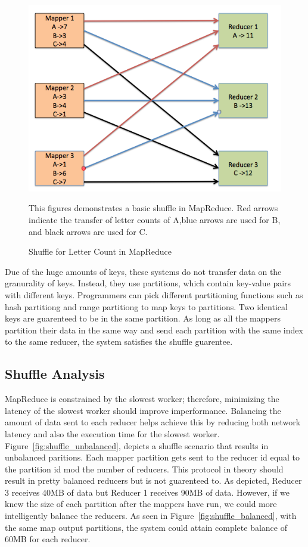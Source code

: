 \begin{figure}[h]
\begin{center}
\includegraphics[scale=0.6]{./img/shuffle_basic.png}
\caption{Shuffle for Letter Count in MapReduce}
\label{fig:shuffle_basic}
This figures demonstrates a basic shuffle in MapReduce. 
Red arrows indicate the transfer of letter counts of A,blue arrows are used for B,
and black arrows are used for C. 
\end{center}
\end{figure}

Due of the huge amounts of keys, these systems do not transfer data on the granurality of keys.
Instead, they use partitions, which contain key-value pairs with different keys. Programmers can pick different partitioning functions such as hash partitiong and range partitiong to map keys to partitions. Two identical keys are guarenteed to be in the same partition. As long as all the mappers partition their data in the same way and send each partition with the same index to the same reducer, the system satisfies 
the shuffle guarentee. 

\subsection {Shuffle Analysis}

MapReduce is constrained by the slowest worker; therefore, minimizing the latency of the slowest worker should improve imperformance.
Balancing the amount of data sent to each reducer helps achieve this by reducing both network latency and also the execution time for the slowest worker.
Figure~\ref{fig:shuffle_unbalanced}, depicts a shuffle scenario that results in unbalanced paritions. Each mapper partition gets sent to the reducer id equal to the partition id mod the number of reducers. This protocol in theory should result in pretty balanced reducers but is not guarenteed to. As depicted, Reducer 3 receives 
40MB of data but Reducer 1 receives 90MB of data. However, if we knew the size of each partition after the mappers have run,
we could more intelligently balance the reducers. As seen in Figure~\ref{fig:shuffle_balanced}, with the same map output partitions, the system could attain complete balance
of 60MB for each reducer.


